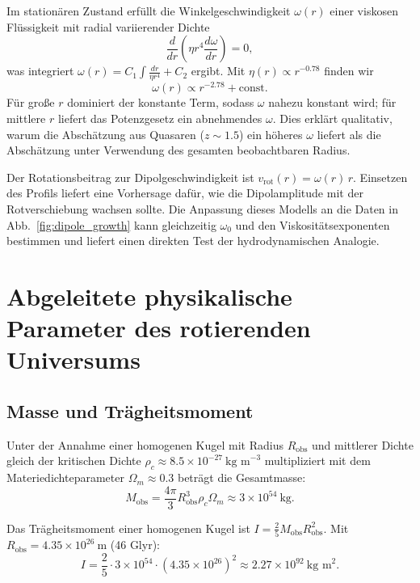 \documentclass[11pt,a4paper]{article}
\begin{document}
	Im stationären Zustand erfüllt die Winkelgeschwindigkeit \(\omega(r)\) einer viskosen Flüssigkeit mit radial variierender Dichte
	\begin{equation}
		\frac{d}{dr}\left( \eta r^4 \frac{d\omega}{dr} \right) = 0,
	\end{equation}
	was integriert \(\omega(r) = C_1 \int \frac{dr}{\eta r^4} + C_2\) ergibt. Mit \(\eta(r) \propto r^{-0.78}\) finden wir
	\begin{equation}
		\omega(r) \propto r^{-2.78} + \text{const}.
	\end{equation}
	Für große \(r\) dominiert der konstante Term, sodass \(\omega\) nahezu konstant wird; für mittlere \(r\) liefert das Potenzgesetz ein abnehmendes \(\omega\). Dies erklärt qualitativ, warum die Abschätzung aus Quasaren (\(z\sim1.5\)) ein höheres \(\omega\) liefert als die Abschätzung unter Verwendung des gesamten beobachtbaren Radius.
	
	Der Rotationsbeitrag zur Dipolgeschwindigkeit ist \(v_{\mathrm{rot}}(r) = \omega(r) \, r\). Einsetzen des Profils liefert eine Vorhersage dafür, wie die Dipolamplitude mit der Rotverschiebung wachsen sollte. Die Anpassung dieses Modells an die Daten in Abb.~\ref{fig:dipole_growth} kann gleichzeitig \(\omega_0\) und den Viskositätsexponenten bestimmen und liefert einen direkten Test der hydrodynamischen Analogie.
	
	\section{Abgeleitete physikalische Parameter des rotierenden Universums}
	
	\subsection{Masse und Trägheitsmoment}
	
	Unter der Annahme einer homogenen Kugel mit Radius \(R_{\text{obs}}\) und mittlerer Dichte gleich der kritischen Dichte \(\rho_c \approx 8.5\times10^{-27}\ \text{kg m}^{-3}\) multipliziert mit dem Materiedichteparameter \(\Omega_m \approx 0.3\) beträgt die Gesamtmasse:
	\begin{equation}
		M_{\text{obs}} = \frac{4\pi}{3} R_{\text{obs}}^3 \rho_c \Omega_m \approx 3 \times 10^{54}\ \text{kg}.
	\end{equation}
	
	Das Trägheitsmoment einer homogenen Kugel ist \(I = \frac{2}{5} M_{\text{obs}} R_{\text{obs}}^2\). Mit \(R_{\text{obs}} = 4.35\times10^{26}\ \text{m}\) (46 Glyr):
	\begin{equation}
		I = \frac{2}{5} \cdot 3\times10^{54} \cdot (4.35\times10^{26})^2 \approx 2.27 \times 10^{92}\ \text{kg m}^2.
	\end{equation}
	
\end{document}
